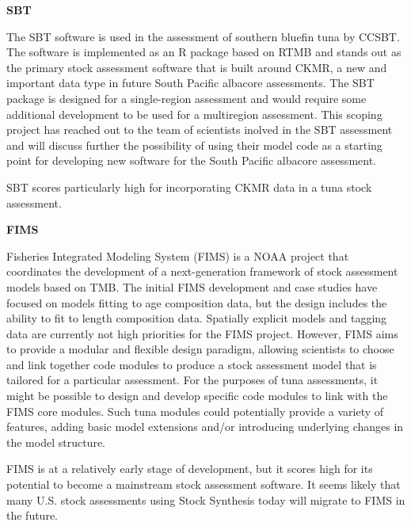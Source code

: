 \documentclass{SCreport}
\begin{document}
\textbf{SBT}

\vspace{-1ex}

The SBT software is used in the assessment of southern bluefin tuna by CCSBT.
The software is implemented as an R package based on RTMB and stands out as the
primary stock assessment software that is built around CKMR, a new and important
data type in future South Pacific albacore assessments. The SBT package is
designed for a single-region assessment and would require some additional
development to be used for a multiregion assessment. This scoping project has
reached out to the team of scientists inolved in the SBT assessment and will
discuss further the possibility of using their model code as a starting point
for developing new software for the South Pacific albacore assessment.

SBT scores particularly high for incorporating CKMR data in a tuna stock
assessment.

\vspace{1ex}

\textbf{FIMS}

\vspace{-1ex}

Fisheries Integrated Modeling System (FIMS) is a NOAA project that coordinates
the development of a next-generation framework of stock assessment models based
on TMB. The initial FIMS development and case studies have focused on models
fitting to age composition data, but the design includes the ability to fit to
length composition data. Spatially explicit models and tagging data are
currently not high priorities for the FIMS project. However, FIMS aims to
provide a modular and flexible design paradigm, allowing scientists to choose
and link together code modules to produce a stock assessment model that is
tailored for a particular assessment. For the purposes of tuna assessments, it
might be possible to design and develop specific code modules to link with the
FIMS core modules. Such tuna modules could potentially provide a variety of
features, adding basic model extensions and/or introducing underlying changes in
the model structure.

FIMS is at a relatively early stage of development, but it scores high for its
potential to become a mainstream stock assessment software. It seems likely that
many U.S. stock assessments using Stock Synthesis today will migrate to FIMS in
the future.

\vspace{1ex}
\end{document}
